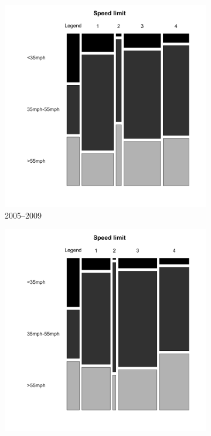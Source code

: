 
\begin{figure}[t]
        \begin{subfigure}{.5\textwidth}
                \includegraphics[width=1\linewidth]{spd_lim_0509.png}
                \caption{2005--2009}
        \end{subfigure}%
        \begin{subfigure}{.5\textwidth}
                \includegraphics[width=1\linewidth]{spd_lim.png}

\end{subfigure}
\end{figure}

